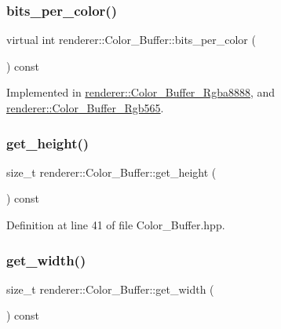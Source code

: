 \subsubsection{\texorpdfstring{bits\_per\_color()}{bits\_per\_color()}}
{\footnotesize\ttfamily virtual int renderer\+::\+Color\+\_\+\+Buffer\+::bits\+\_\+per\+\_\+color (\begin{DoxyParamCaption}{ }\end{DoxyParamCaption}) const\hspace{0.3cm}{\ttfamily [pure virtual]}}



Implemented in \mbox{\hyperlink{classrenderer_1_1_color___buffer___rgba8888_a1f241495c36d199a64289478b92a1638}{renderer\+::\+Color\+\_\+\+Buffer\+\_\+\+Rgba8888}}, and \mbox{\hyperlink{classrenderer_1_1_color___buffer___rgb565_a71920b761aa6ce5b05c1e587c168a6d4}{renderer\+::\+Color\+\_\+\+Buffer\+\_\+\+Rgb565}}.

\mbox{\label{classrenderer_1_1_color___buffer_a75e5eddc9bc168ee6c65276b1e716047}} 
\subsubsection{\texorpdfstring{get\_height()}{get\_height()}}
{\footnotesize\ttfamily size\+\_\+t renderer\+::\+Color\+\_\+\+Buffer\+::get\+\_\+height (\begin{DoxyParamCaption}{ }\end{DoxyParamCaption}) const\hspace{0.3cm}{\ttfamily [inline]}}



Definition at line 41 of file Color\+\_\+\+Buffer.\+hpp.

\mbox{\label{classrenderer_1_1_color___buffer_a719d5481887bcae92797f566b21d2b64}} 
\subsubsection{\texorpdfstring{get\_width()}{get\_width()}}
{\footnotesize\ttfamily size\+\_\+t renderer\+::\+Color\+\_\+\+Buffer\+::get\+\_\+width (\begin{DoxyParamCaption}{ }\end{DoxyParamCaption}) const\hspace{0.3cm}{\ttfamily [inline]}}



